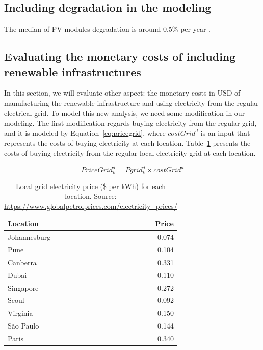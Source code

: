 \subsection{Including degradation in the modeling}

The median of PV modules degradation is around 0.5\% per year \cite{jordan2015_pvdegradationrate}.


\subsection{Evaluating the monetary costs of including renewable infrastructures}





In this section, we will evaluate other aspect: the monetary costs in USD of manufacturing the renewable infrastructure and using electricity from the regular electrical grid.  To model this new analysis, we need some modification in our modeling. The first modification regards buying electricity from the regular grid, and it is modeled by Equation~\eqref{eq:pricegrid}, where $costGrid^d$ is an input that represents the costs of buying electricity at each location.  Table~\ref{tab:grid_price} presents the costs of buying electricity from the regular local electricity grid at each location.

\begin{equation} \label{eq:pricegrid}
 PriceGrid^d_k = Pgrid^d_k \times costGrid^d
\end{equation}


\begin{table}[H]
  
  \caption{Local grid electricity price (\$ per kWh) for each location. Source: \url{ https://www.globalpetrolprices.com/electricity_prices/}}\label{tab:grid_price} \centering

  \begin{tabular}{|l|r|}
   \hline
    
  \textbf{Location} &   \textbf{Price} \\
  \hline
  Johannesburg & 0.074   \\
  \hline
  Pune  & 0.104 \\
  \hline
  Canberra  & 0.331 \\
  \hline
  Dubai   &  0.110\\
  \hline
  Singapore & 0.272  \\
  \hline     
  Seoul    & 0.092  \\
  \hline
  Virginia   & 0.150 \\
  \hline
  São Paulo   & 0.144 \\
  \hline 
  Paris    &    0.340 \\
  
  \hline  

\end{tabular}  
\end{table}

